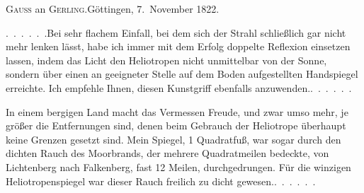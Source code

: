 \begin{center}
\textsc{Gauss} an \textsc{Gerling}.\quad Göttingen, 7.~November 1822.
\end{center}

\par\noindent\hspace*{\parindent}\mbox{.\ .\ .\ .\ .\ .}\quad Bei sehr flachem Einfall, bei dem sich der Strahl schließlich gar nicht mehr lenken lässt, habe ich immer mit dem  Erfolg doppelte Reflexion einsetzen lassen, indem das Licht den Heliotropen nicht unmittelbar von der Sonne, sondern über einen an geeigneter Stelle auf dem Boden aufgestellten Handspiegel erreichte.
Ich empfehle Ihnen, diesen Kunstgriff ebenfalls anzuwenden.\quad\mbox{.\ .\ .\ .\ .\ .}

\par\noindent\hspace*{\parindent}In einem bergigen Land macht das Vermessen Freude, und zwar umso mehr, je größer die Entfernungen sind, denen beim Gebrauch der Heliotrope überhaupt keine Grenzen gesetzt sind.
Mein  Spiegel, 1 Quadratfuß, war sogar durch den dichten Rauch des Moorbrands, der mehrere Quadratmeilen bedeckte, von Lichtenberg nach Falkenberg, fast 12 Meilen, durchgedrungen. Für die winzigen Heliotropenspiegel war dieser Rauch freilich zu dicht gewesen.\quad\mbox{.\ .\ .\ .\ .\ .}
